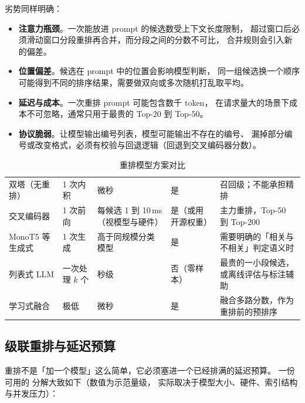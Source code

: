 劣势同样明确：
\begin{itemize}
  \item \textbf{注意力瓶颈}。一次能放进 prompt 的候选数受上下文长度限制，
        超过窗口后必须滑动窗口分段重排再合并，而分段之间的分数不可比，
        合并规则会引入新的偏差。
  \item \textbf{位置偏差}。候选在 prompt 中的位置会影响模型判断，
        同一组候选换一个顺序可能得到不同的排序结果，需要做双向或多次随机打乱取平均。
  \item \textbf{延迟与成本}。一次重排 prompt 可能包含数千 token，
        在请求量大的场景下成本不可忽略，通常只用于最贵的 Top-20 到 Top-50。
  \item \textbf{协议脆弱}。让模型输出编号列表，模型可能输出不存在的编号、
        漏掉部分编号或改变格式，必须有校验与回退逻辑（回退到交叉编码器分数）。
\end{itemize}

\begin{table}[htbp]
\centering
\caption{重排模型方案对比}
\label{tab:rerank-compare}
\small
\begin{tabularx}{\textwidth}{L{2.3cm} L{2.0cm} L{2.4cm} L{1.9cm} Y}
\toprule
{} &  &  &  &  \\
\midrule
双塔（无重排） & 1 次内积 & 微秒 & 是 & 召回级；不能承担精排 \\
\addlinespace
交叉编码器 & 1 次前向 & 每候选 1 到 10\,ms（视模型与硬件） & 是（或用开源权重） &
主力重排，Top-50 到 Top-200 \\
\addlinespace
MonoT5 等生成式 & 1 次生成 & 高于同规模分类模型 & 是 & 需要明确的「相关与不相关」判定语义时 \\
\addlinespace
列表式 LLM & 一次处理 $k$ 个 & 秒级 & 否（零样本） & 最贵的一小段候选，或离线评估与标注辅助 \\
\addlinespace
学习式融合 & 极低 & 微秒 & 是 & 融合多路分数，作为重排前的预排序 \\
\bottomrule
\end{tabularx}
\end{table}

\subsection{级联重排与延迟预算}

重排不是「加一个模型」这么简单，它必须塞进一个已经排满的延迟预算。
一份可用的 分解大致如下（数值为示范量级，
实际取决于模型大小、硬件、索引结构与并发压力）：

